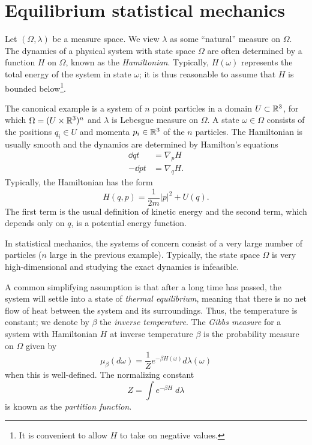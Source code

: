 
\section{Equilibrium statistical mechanics}
\label{sec:gibbs}

Let $(\Omega, \lambda)$ be a measure space. We view $\lambda$ as some ``natural''
measure on $\Omega$. The dynamics of a physical system with state space $\Omega$
are often determined by a function $H$ on $\Omega$, known as the \emph{Hamiltonian}.
Typically, $H(\omega)$ represents the total energy of the system in state $\omega$;
it is thus reasonable to assume that $H$ is bounded below\footnote{It is convenient
to allow $H$ to take on negative values.}.

\begin{example}
\label{ex:hamilton}
The canonical example is a system of $n$ point particles in a domain $U \subset {\mathbb R}^3$,
for which $\Omega = (U \times {\mathbb R}^3)^n$ and $\lambda$ is Lebesgue measure on $\Omega$.
A state $\omega\in\Omega$ consists of the positions $q_i \in U$ and momenta $p_i \in {\mathbb R}^3$
of the $n$ particles. The Hamiltonian is usually smooth and the dynamics are determined
by Hamilton's equations
\begin{align}
\dd{q}{t} 	&= \nabla_p H \\
-\dd{p}{t} 	&= \nabla_q H.
\end{align}
Typically, the Hamiltonian has the form
\begin{equation}
\label{e:total-energy}
H(q, p) = \frac{1}{2m} |p|^2 + U(q).
\end{equation}
The first term is the usual definition of kinetic energy and the second term,
which depends only on $q$, is a potential energy function.
\end{example}

In statistical mechanics, the systems of concern consist of a very large number
of particles ($n$ large in the previous example). Typically, the state space
$\Omega$ is very high-dimensional and studying the exact dynamics is infeasible.

A common simplifying assumption is that after a long time has passed, the system
will settle into a state of \emph{thermal equilibrium}, meaning that there is no
net flow of heat between the system and its surroundings. Thus, the temperature is
constant; we denote by $\beta$ the \emph{inverse temperature}. The \emph{Gibbs measure} %
for a system with Hamiltonian $H$ at inverse temperature
$\beta$ is the probability measure on $\Omega$ given by
\begin{equation}
\label{e:gibbs-def}
\mu_\beta(d\omega) = \frac{1}{Z} e^{-\beta H(\omega)} d\lambda(\omega)
\end{equation}
when this is well-defined.
The normalizing constant
\begin{equation}
Z = \int e^{-\beta H} \; d\lambda
\end{equation}
is known as the \emph{partition function}.


